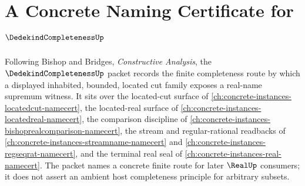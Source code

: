 \chapter{A Concrete Naming Certificate for $\DedekindCompletenessUp$}
\label{ch:concrete-instances-dedekindcompleteness-namecert}

Following Bishop and Bridges, \emph{Constructive Analysis}, the $\DedekindCompletenessUp$ packet records the finite completeness route by which a displayed inhabited, bounded, located cut family exposes a real-name supremum witness. It sits over the located-cut surface of \autoref{ch:concrete-instances-locatedcut-namecert}, the located-real surface of \autoref{ch:concrete-instances-locatedreal-namecert}, the comparison discipline of \autoref{ch:concrete-instances-bishoprealcomparison-namecert}, the stream and regular-rational readbacks of \autoref{ch:concrete-instances-streamname-namecert} and \autoref{ch:concrete-instances-regseqrat-namecert}, and the terminal real seal of \autoref{ch:concrete-instances-real-namecert}. The packet names a concrete finite route for later $\RealUp$ consumers; it does not assert an ambient host completeness principle for arbitrary subsets.

